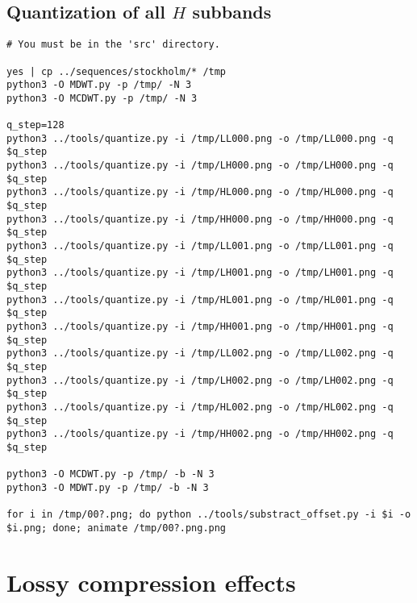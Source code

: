 
\subsection{Quantization of all $H$ subbands}
\begin{verbatim}
# You must be in the 'src' directory.

yes | cp ../sequences/stockholm/* /tmp
python3 -O MDWT.py -p /tmp/ -N 3
python3 -O MCDWT.py -p /tmp/ -N 3

q_step=128
python3 ../tools/quantize.py -i /tmp/LL000.png -o /tmp/LL000.png -q $q_step
python3 ../tools/quantize.py -i /tmp/LH000.png -o /tmp/LH000.png -q $q_step
python3 ../tools/quantize.py -i /tmp/HL000.png -o /tmp/HL000.png -q $q_step
python3 ../tools/quantize.py -i /tmp/HH000.png -o /tmp/HH000.png -q $q_step
python3 ../tools/quantize.py -i /tmp/LL001.png -o /tmp/LL001.png -q $q_step
python3 ../tools/quantize.py -i /tmp/LH001.png -o /tmp/LH001.png -q $q_step
python3 ../tools/quantize.py -i /tmp/HL001.png -o /tmp/HL001.png -q $q_step
python3 ../tools/quantize.py -i /tmp/HH001.png -o /tmp/HH001.png -q $q_step
python3 ../tools/quantize.py -i /tmp/LL002.png -o /tmp/LL002.png -q $q_step
python3 ../tools/quantize.py -i /tmp/LH002.png -o /tmp/LH002.png -q $q_step
python3 ../tools/quantize.py -i /tmp/HL002.png -o /tmp/HL002.png -q $q_step
python3 ../tools/quantize.py -i /tmp/HH002.png -o /tmp/HH002.png -q $q_step

python3 -O MCDWT.py -p /tmp/ -b -N 3
python3 -O MDWT.py -p /tmp/ -b -N 3

for i in /tmp/00?.png; do python ../tools/substract_offset.py -i $i -o $i.png; done; animate /tmp/00?.png.png
\end{verbatim}


\section{Lossy compression effects}


